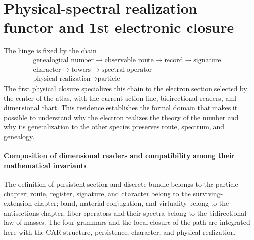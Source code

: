 \section{Physical-spectral realization functor and 1st electronic closure}

The hinge is fixed by the chain
\[
 \boxed{\begin{gathered}
 \text{genealogical number}
 \longrightarrow\text{observable route}
 \longrightarrow\text{record}
 \longrightarrow\text{signature}
 \\
 \text{character}
 \longrightarrow\text{towers}
 \longrightarrow\text{spectral operator}
 \\
 \text{physical realization}
 \longrightarrow\text{particle}
 \end{gathered}}
\]
The first physical closure specializes this chain to the electron section selected by the center of the atlas, with the current action line, bidirectional readers, and dimensional chart. This residence establishes the formal domain that makes it possible to understand why the electron realizes the theory of the number and why its generalization to the other species preserves route, spectrum, and genealogy.

\paragraph{Composition of dimensional readers and compatibility among their mathematical invariants}
The definition of persistent section and discrete bundle belongs to the
particle chapter; route, register, signature, and character belong to the
surviving-extension chapter; band, material conjugation, and virtuality belong
to the antisections chapter; fiber operators and their spectra belong to the
bidirectional law of masses. The four grammars and the local closure of the
path are integrated here with the CAR structure, persistence, character,
and physical realization.
